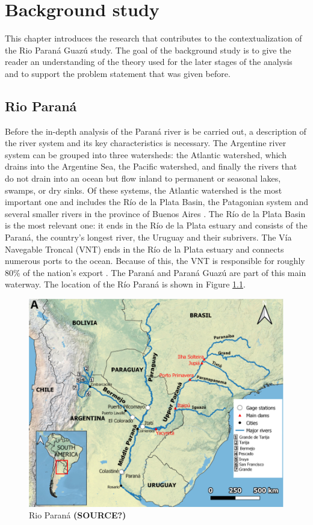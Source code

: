 \chapter{Background study}
\label{chapter:background}
This chapter introduces the research that contributes to the contextualization of the Rio Paraná Guazú study. The goal of the background study is to give the reader an understanding of the theory used for the later stages of the analysis and to support the problem statement that was given before.

\section{Rio Paraná}
Before the in-depth analysis of the Paraná river is be carried out, a description of the river system and its key characteristics is necessary. The Argentine river system can be grouped into three watersheds: the Atlantic watershed, which drains into the Argentine Sea, the Pacific watershed, and finally the rivers that do not drain into an ocean but flow inland to permanent or seasonal lakes, swamps, or dry sinks. Of these systems, the Atlantic watershed is the most important one and includes the Río de la Plata Basin, the Patagonian system and several smaller rivers in the province of Buenos Aires \autocite{farberHydrographyArgentina2024}. The Río de la Plata Basin is the most relevant one: it ends in the Río de la Plata estuary and consists of the Paraná, the country's longest river, the Uruguay and their subrivers. The Vía Navegable Troncal (VNT) ends in the Río de la Plata estuary and connects numerous ports to the ocean. Because of this, the VNT is responsible for roughly 80\% of the nation's export \autocite{agencianacionaldepuertosynavegacionNavegableTroncal2025}. The Paraná and Paraná Guazú are part of this main waterway. The location of the Río Paraná is shown in Figure \ref{fig:rio parana map}.

\begin{figure}[h]
    \centering    \includegraphics[width=0.65\linewidth]{figures/ch2/map rio parana.png}
    \caption{Rio Paraná  \textbf{(SOURCE?)}}
    \label{fig:rio parana map}
\end{figure}

